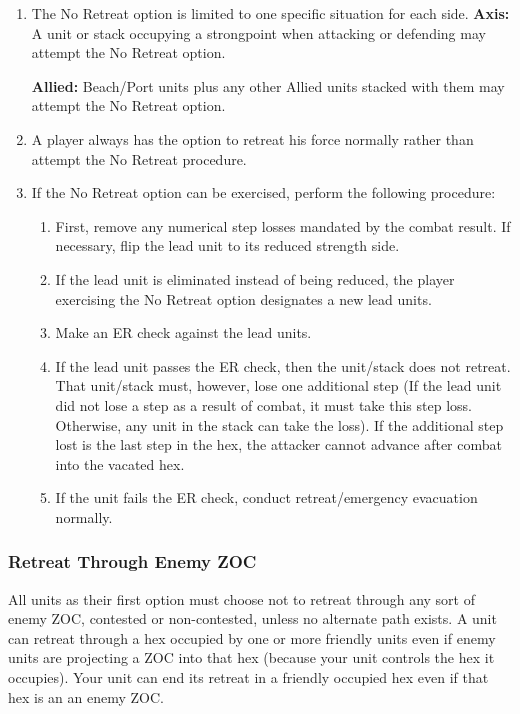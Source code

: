 \begin{enumerate}[label=\alph*.]
    \item The No Retreat option is limited to one specific situation for each side.
    \textbf{Axis:} A unit or stack occupying a strongpoint when attacking or defending may attempt the No Retreat option.
    
    \textbf{Allied:} Beach/Port units plus any other Allied units stacked with them may attempt the No Retreat option.
    
    \item A player always has the option to retreat his force normally rather than attempt the No Retreat procedure.
    
    \item If the No Retreat option can be exercised, perform the following procedure:
    
    \begin{enumerate}[label=\arabic*)]
        \item First, remove any numerical step losses mandated by the combat result. If necessary, flip the lead unit to its reduced strength side.
        \item If the lead unit is eliminated instead of being reduced, the player exercising the No Retreat option designates a new lead units.
        \item Make an ER check against the lead units.
        \item If the lead unit passes the ER check, then the unit/stack does not retreat. That unit/stack must, however, lose one additional step (If the lead unit did not lose a step as a result of combat, it must take this step loss. Otherwise, any unit in the stack can take the loss). If the additional step lost is the last step in the hex, the attacker cannot advance after combat into the vacated hex.
        \item If the unit fails the ER check, conduct retreat/emergency evacuation normally.
    \end{enumerate}
\end{enumerate}

\subsubsection{\textbf{Retreat Through Enemy ZOC}}

All units as their first option must choose not to retreat through any sort of enemy ZOC, contested or non-contested, unless no alternate path exists. A unit can retreat through a hex occupied by one or more friendly units even if enemy units are projecting a ZOC into that hex (because your unit controls the hex it occupies). Your unit can end its retreat in a friendly occupied hex even if that hex is an an enemy ZOC.

